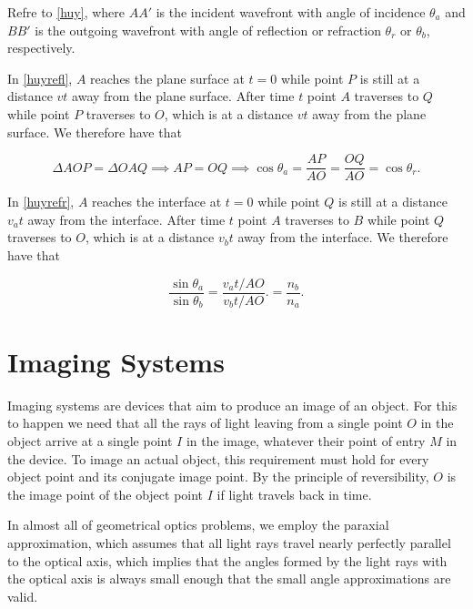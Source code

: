 \documentclass[english,a4paper,12pt]{report}
\begin{document}
Refre to \cref{huy}, where \(AA'\) is the incident wavefront with angle of incidence \(\theta _{a} \)  and \(BB'\) is the outgoing wavefront with angle of reflection or refraction \(\theta _{r} \text { or } \theta _{b}  \), respectively.

In \cref{huyrefl}, \(A\) reaches the plane surface at \(t = 0\) while point \(P\) is still at a distance \(vt\) away from the plane surface. After time \(t\) point \(A\) traverses to \(Q\) while point \(P\) traverses to \(O\), which is at a distance \(vt\) away from the plane surface. We therefore have that 

\begin{equation}
    \Delta AOP = \Delta OAQ \implies AP = OQ \implies \cos \theta _{a} = \frac{AP}{AO} = \frac{OQ}{AO} = \cos \theta _{r}.   
\end{equation}

In \cref{huyrefr}, \(A\) reaches the interface at \(t = 0\) while point \(Q\) is still at a distance \(v_{a} t\) away from the interface. After time \(t\) point \(A\) traverses to \(B\) while point \(Q\) traverses to \(O\), which is at a distance \(v_{b} t\) away from the interface. We therefore have that

\begin{equation}
    \frac{\sin \theta _{a} }{\sin \theta _{b} } =  \frac{v_{a}t /AO}{v_{b}t /AO }. = \frac{n_{b} }{n_{a}}.  
\end{equation}




\section{Imaging Systems}

Imaging systems are devices that aim to produce an image of an object. For this to happen we need that all the rays of light leaving from a single point \(O\) in the object arrive at a single point \(I\) in the image, whatever their point of entry \(M\) in the device. To image an actual object, this requirement must hold for every object point and its conjugate image point. By the principle of reversibility, \(O\) is the image point of the object point \(I\) if light travels back in time.

In almost all of geometrical optics problems, we employ the paraxial approximation, which assumes that all light rays travel nearly perfectly parallel to the optical axis, which implies that the angles formed by the light rays with the optical axis is always small enough that the small angle approximations are valid.
\end{document}
